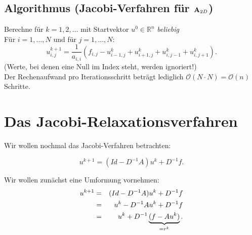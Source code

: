 

\subsection{Algorithmus (Jacobi-Verfahren für ${\textbf{A}}_{2D}$)}\label{ss.Jacobi für Poisson}

Berechne für $k = 1,2,...$ mit Startvektor $u^{0} \in \mathbb{R}^{n}$ \textit{beliebig}\\
Für $i = 1,...,N$ und für $j = 1,...,N$:
\begin{equation}
u^{k+1}_{i,j} =  \frac {1} {a_{i,i}} (f_{i,j} - u^{k}_{i-1,j} + u^{k}_{i+1,j} + u^{k}_{i,j-1} + u^{k}_{i,j+1}).
\end{equation}
(Werte, bei denen eine Null im Index steht, werden ignoriert!)\\
Der Rechenaufwand pro Iterationsschritt beträgt lediglich $\mathcal{O}(N \cdot N)=\mathcal{O}(n)$ Schritte.

\section{Das Jacobi-Relaxationsverfahren}\label{s.Jacobi Relaxation}

Wir wollen nochmal das Jacobi-Verfahren betrachten:

\begin{equation}
u^{k+1} = (Id - D^{-1}A)u^{k} + D^{-1}f.
\end{equation}

Wir wollen zunächst eine Umformung vornehmen:
\begin{eqnarray}
u^{k+1} &=& (Id - D^{-1}A)u^{k} + D^{-1}f \notag \\
&=& u^{k} - D^{-1}Au^{k} + D^{-1}f \notag \\
&=& u^{k} + D^{-1} \underbrace{(f - Au^{k})}_{= r^{k}}.
\end{eqnarray}


